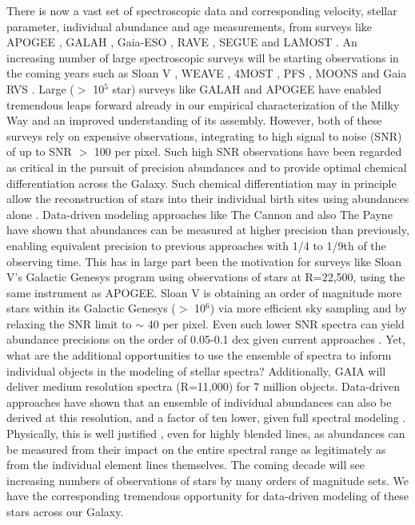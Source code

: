 \documentclass[a4paper,fleqn,usenatbib]{mnras}
\begin{document}
There is now a vast set of spectroscopic data and corresponding velocity, stellar parameter, individual abundance and age measurements, from surveys like APOGEE \citep{Majewski2017}, GALAH \citep{deSilva2015}, Gaia-ESO \citep{Gilmore2012}, RAVE \citep{Steinmetz2006}, SEGUE \citep{Yanny2009} and LAMOST \citep{Newberg2012}. An increasing number of large spectroscopic surveys will be starting observations in the coming years such as Sloan V \citep{Kollmeier2017}, WEAVE \citep{Bonifacio2016}, 4MOST \citep{deJong2019}, PFS \citep{PFS2018}, MOONS \citep{C2014} and Gaia RVS \citep{Gaia2016}. Large ($>$ 10$^5$ star) surveys like GALAH and APOGEE have enabled tremendous leaps forward already in our empirical characterization of the Milky Way and an improved understanding of its assembly. However, both of these surveys rely on expensive observations, integrating to high signal to noise (SNR) of up to SNR $>$ 100 per pixel. Such high SNR observations have been regarded as critical in the pursuit of precision abundances and to provide optimal chemical differentiation across the Galaxy. Such chemical differentiation may in principle allow the reconstruction of stars into their individual birth sites using abundances alone \citep[e.g.][]{BH2010}. Data-driven modeling approaches like The Cannon \citep{Ness2015} and also The Payne \citep{Ting2017} have shown that abundances can be measured at higher precision than previously, enabling equivalent precision to previous approaches with 1/4 to 1/9th of the observing time. This has in large part been the motivation for surveys like Sloan V's Galactic Genesys program using observations of stars at R=22,500, using the same instrument as APOGEE. Sloan V is obtaining an order of magnitude more stars within its Galactic Genesys  ($>$ 10$^6$) via more efficient sky sampling and by relaxing the SNR limit to $\sim$ 40 per pixel. Even such lower SNR spectra can yield  abundance precisions on the order of 0.05-0.1 dex given current approaches \citep{Ness2015, Ting2015}. Yet, what are the additional opportunities to use the ensemble of spectra to inform individual objects in the modeling of stellar spectra? Additionally, GAIA will deliver medium resolution spectra (R=11,000) for 7 million objects. Data-driven approaches have shown that an ensemble of individual abundances can also be derived at this resolution, and a factor of ten lower, given full spectral modeling \citep[e.g.][and Wheeler et al., in prep]{Casey2016, Ting2017}. Physically, this is well justified  \citep{Ting 2018}, even for highly blended lines, as abundances can be measured from their impact on the entire spectral range as legitimately as from the individual element lines themselves. The coming decade will see increasing numbers of observations of stars by many orders of magnitude sets. We have the corresponding tremendous opportunity for data-driven modeling of these stars across our Galaxy. 
\end{document}
